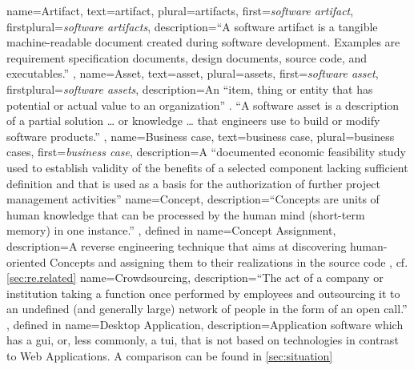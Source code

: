  {
  name=Artifact,
  text=artifact,
  plural=artifacts,
  first={\emph{software artifact}}, 
  firstplural={\emph{software artifacts}}, 
  description={``A software artifact is a tangible machine-readable document created during software development. Examples are requirement specification documents, design documents, source code, and executables.'' \autocite{OMG2016KDM}, \autocite[cf.~\emph{physical asset}][entry 3.261]{ISO/IEEE24765Vocabulary}}
}
 {
  name=Asset,
  text=asset,
  plural=assets,
  first={\emph{software asset}}, 
  firstplural={\emph{software assets}}, 
  description={An ``item, thing or entity that has potential or actual value to an organization'' \autocite{ISO/IEEE24765Vocabulary}. ``A software asset is a description of a partial solution \ldots{} or knowledge \ldots{} that engineers use to build or modify software products.'' \autocite{OMG2016KDM}, \autocite[cf.~\emph{intangible assets}][entry 3.261]{ISO/IEEE24765Vocabulary}}
}
 {
  name=Business case,
  text=business case,
  plural=business cases,
  first={\emph{business case}},
  description={A ``documented economic feasibility study used to establish validity of the benefits of a selected component lacking sufficient definition and that is used as a basis for the authorization of further project management activities'' \autocite[][entry 3.442]{ISO/IEEE24765Vocabulary}}
}
 {
  name=Concept,
  description={``Concepts are units of human knowledge that can be processed by the human mind (short-term memory) in one instance.'' \autocite{Rajlich2002Concepts}, defined in }
}
 {
  name=Concept Assignment,
  description={A reverse engineering technique that aims at discovering human-oriented \glspl{Concept} and assigning them to their realizations in the source code \autocite{Biggerstaff1994ConceptAssignmentJournal}, cf. \cref{sec:re.related}}
}
 {
  name=Crowdsourcing,
  description={``The act of a company or institution taking a function once performed by employees and outsourcing it to an undefined (and generally large) network of people in the form of an open call.'' \autocite{Howe2006}, defined in }
}
 {
  name=Desktop Application,
  description={Application software which has a \gls{gui}, or, less commonly, a \gls{tui}, that is not based on \web technologies in contrast to \glspl{Web Application}. A comparison can be found in \cref{sec:situation}}
}

